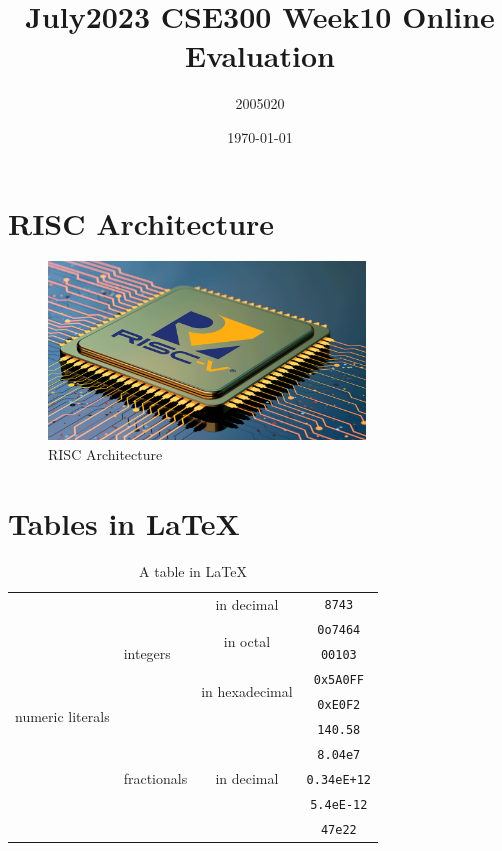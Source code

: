 \documentclass[11pt]{article}
\title{July2023 CSE300 Week10 Online Evaluation}
\author{2005020}
\date{\today}
\begin{document}
    \maketitle
    \tableofcontents

\newpage

\section{RISC Architecture}

\begin{figure}[!h]
    \centering
    \includegraphics[width = 0.75\textwidth]{Images/risc.png}
    \caption{RISC Architecture}
    \label{fig:risc}
\end{figure}

\section{Tables in \LaTeX}

\begin{table}[!h]
    \centering
    \begin{tabular}{|c|l|c|c|}
        \hline
        \multirow{10}{*}{numeric literals} & \multirow{5}{*}{integers} & in decimal & \verb|8743| \\ \cline{3-4}
        & & \multirow{2}{*}{in octal} & \verb|0o7464| \\ \cline{4-4}
        & & & \verb|00103| \\ \cline{3-4}
        & & \multirow{2}{*}{in hexadecimal} & \verb|0x5A0FF| \\ \cline{4-4}
        & & & \verb|0xE0F2| \\ \cline{2-4}
        &  \multirow{5}{*}{fractionals} &  \multirow{5}{*}{in decimal} & \verb|140.58| \\ \cline{4-4}
        & & & \verb|8.04e7| \\ \cline{4-4}
        & & & \verb|0.34eE+12| \\ \cline{4-4}
        & & & \verb|5.4eE-12| \\ \cline{4-4}
        & & & \verb|47e22| \\ \hline
    \end{tabular}
    \caption{A table in \LaTeX}
    \label{tab:tab1}
\end{table}
\end{document}
